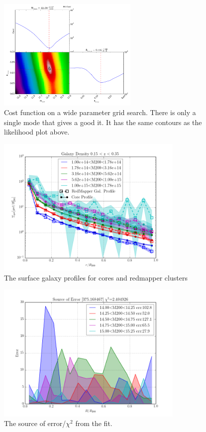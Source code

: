 \documentclass[twocolumn]{article}
\begin{document}
\begin{figure}[H]
  \center\includegraphics[width=0.6\textwidth]{figs/cfn/basic_rm_wide.param/calc_likelihood_bounds.py/fig2.png}
  \caption{Cost function on a wide parameter grid search. There is only a single mode that gives a good it. It has the same
  contours as the likelihood plot above.}
  \label{fig:basic_rm:cost}
\end{figure}

\begin{figure}[H]
  \center\includegraphics[width=0.8\textwidth]{figs/cfn/basic_rm.param/plot_zmrs.py/fig1.png}
  \caption{The surface galaxy profiles for cores and redmapper clusters}
  \label{fig:basic_rm:profile}
\end{figure}

\begin{figure}[H]
  \center\includegraphics[width=0.8\textwidth]{figs/cfn/basic_rm.param/plot_zmrs.py/fig9.png}
  \caption{The source of error/$\chi^{2}$ from the fit. }
  \label{fig:basic_rm:error}
\end{figure}
\end{document}
